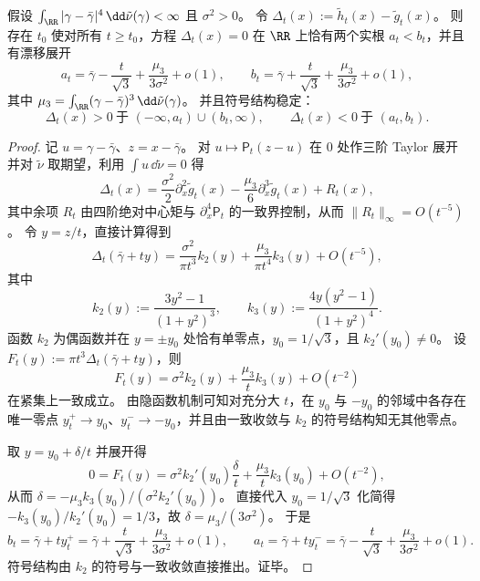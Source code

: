 \begin{theorem}[密度交点的常数级漂移由三阶中心矩完全决定]\label{thm:xi-poisson-cauchy-density-intersection-drift-m3}
假设 \(\int_{\RR}|\gamma-\bar\gamma|^{4}\,\dd\tilde\nu(\gamma)<\infty\) 且 \(\sigma^2>0\)。
令
\(
\Delta_t(x):=\tilde h_t(x)-\tilde g_t(x)
\)。
则存在 \(t_0\) 使对所有 \(t\ge t_0\)，方程 \(\Delta_t(x)=0\) 在 \(\RR\) 上恰有两个实根 \(a_t<b_t\)，并且有漂移展开
\[
a_t=\bar\gamma-\frac{t}{\sqrt3}+\frac{\mu_3}{3\sigma^2}+o(1),
\qquad
b_t=\bar\gamma+\frac{t}{\sqrt3}+\frac{\mu_3}{3\sigma^2}+o(1),
\]
其中 \(\mu_3=\int_{\RR}(\gamma-\bar\gamma)^3\,\dd\tilde\nu(\gamma)\)。
并且符号结构稳定：
\[
\Delta_t(x)>0\ \text{于 }(-\infty,a_t)\cup(b_t,\infty),
\qquad
\Delta_t(x)<0\ \text{于 }(a_t,b_t).
\]
\end{theorem}
\begin{proof}
记 \(u=\gamma-\bar\gamma\)、\(z=x-\bar\gamma\)。
对 \(u\mapsto \mathsf P_t(z-u)\) 在 \(0\) 处作三阶 Taylor 展开并对 \(\tilde\nu\) 取期望，利用 \(\int u\,\dd\tilde\nu=0\) 得
\[
\Delta_t(x)=\frac{\sigma^2}{2}\partial_x^2\tilde g_t(x)-\frac{\mu_3}{6}\partial_x^3\tilde g_t(x)+R_t(x),
\]
其中余项 \(R_t\) 由四阶绝对中心矩与 \(\partial_x^4\mathsf P_t\) 的一致界控制，从而 \(\|R_t\|_\infty=O(t^{-5})\)。
令 \(y=z/t\)，直接计算得到
\[
\Delta_t(\bar\gamma+ty)=\frac{\sigma^2}{\pi t^3}k_2(y)+\frac{\mu_3}{\pi t^4}k_3(y)+O(t^{-5}),
\]
其中
\[
k_2(y):=\frac{3y^2-1}{(1+y^2)^3},
\qquad
k_3(y):=\frac{4y(y^2-1)}{(1+y^2)^4}.
\]
函数 \(k_2\) 为偶函数并在 \(y=\pm y_0\) 处恰有单零点，\(y_0=1/\sqrt3\)，且 \(k_2'(y_0)\neq 0\)。
设
\(
F_t(y):=\pi t^3\Delta_t(\bar\gamma+ty)
\)，则
\[
F_t(y)=\sigma^2 k_2(y)+\frac{\mu_3}{t}k_3(y)+O(t^{-2})
\]
在紧集上一致成立。
由隐函数机制可知对充分大 \(t\)，在 \(y_0\) 与 \(-y_0\) 的邻域中各存在唯一零点 \(y_t^+\to y_0\)、\(y_t^-\to -y_0\)，并且由一致收敛与 \(k_2\) 的符号结构知无其他零点。

取 \(y=y_0+\delta/t\) 并展开得
\[
0=F_t(y)=\sigma^2 k_2'(y_0)\frac{\delta}{t}+\frac{\mu_3}{t}k_3(y_0)+O(t^{-2}),
\]
从而 \(\delta=-\mu_3 k_3(y_0)/(\sigma^2 k_2'(y_0))\)。
直接代入 \(y_0=1/\sqrt3\) 化简得
\(
-k_3(y_0)/k_2'(y_0)=1/3
\)，故 \(\delta=\mu_3/(3\sigma^2)\)。
于是
\[
b_t=\bar\gamma+t y_t^+=\bar\gamma+\frac{t}{\sqrt3}+\frac{\mu_3}{3\sigma^2}+o(1),
\qquad
a_t=\bar\gamma+t y_t^-=\bar\gamma-\frac{t}{\sqrt3}+\frac{\mu_3}{3\sigma^2}+o(1).
\]
符号结构由 \(k_2\) 的符号与一致收敛直接推出。证毕。
\end{proof}

